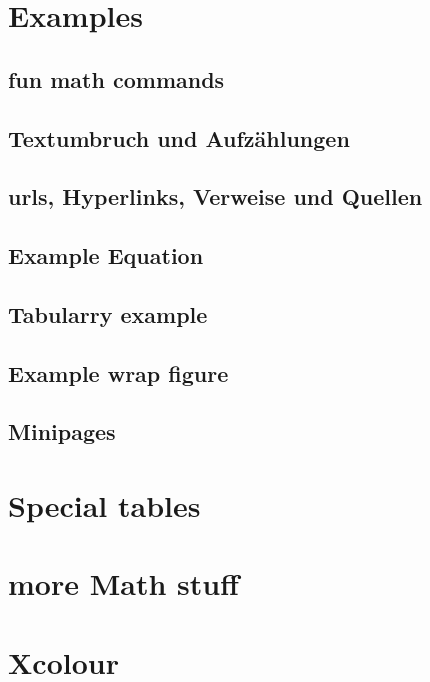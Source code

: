 \documentclass[final, 12pt]{article}
\begin{document}
  

\section{Examples}
\subsection{fun math commands}


\subsection{Textumbruch und Aufzählungen}


\subsection{urls, Hyperlinks, Verweise und Quellen}


\subsection{Example Equation}


\subsection{Tabularry example}


\subsection{Example wrap figure}


\subsection{Minipages}


\section{Special tables}


\section{more Math stuff}


\section{Xcolour}


\newpage
\listoftables
\listoffigures
\printbibliography{}
\end{document}
